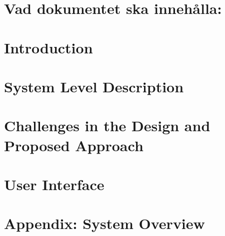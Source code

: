 \chapter{Vad dokumentet ska innehålla:} %

\chapter{Introduction}\label{ch:introduction}


\chapter{System Level Description}\label{ch:description}


\chapter{Challenges in the Design and Proposed Approach}\label{ch:challenges}


\chapter{User Interface}\label{ch:UI}


\appendix
\newpage
{}
\chapter{Appendix: System Overview}\label{app:overview}


